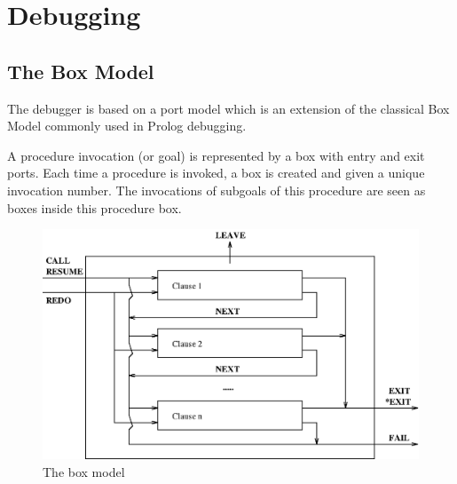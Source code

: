 %
%
%
%
%
%
%

\chapter{Debugging}
\label{chapdebug}

\section{The Box Model}
\label{boxmodel}

The {\eclipse} debugger is based on a port model which is an extension
of the classical Box Model commonly used in Prolog debugging.

A procedure invocation (or goal) is represented by a box with entry
and exit ports.  Each time a procedure is invoked, a box is created
and given a unique invocation number.  The invocations of subgoals of
this procedure are seen as boxes inside this procedure box.

\begin{figure}
\begin{center}
\includegraphics{boxmodel.eps}
\end{center}
\caption{The box model}
\end{figure}


